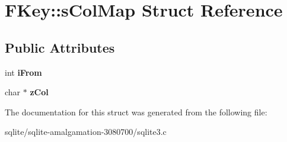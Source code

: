\hypertarget{struct_f_key_1_1s_col_map}{\section{F\+Key\+:\+:s\+Col\+Map Struct Reference}
\label{struct_f_key_1_1s_col_map}
}
\subsection*{Public Attributes}
\begin{DoxyCompactItemize}
\item 
\hypertarget{struct_f_key_1_1s_col_map_a2b0ed19d4924a93d1f3f14f891b176ed}{int {\bfseries i\+From}}\label{struct_f_key_1_1s_col_map_a2b0ed19d4924a93d1f3f14f891b176ed}

\item 
\hypertarget{struct_f_key_1_1s_col_map_a4cdef475be73cc460873051a2c2c2937}{char $\ast$ {\bfseries z\+Col}}\label{struct_f_key_1_1s_col_map_a4cdef475be73cc460873051a2c2c2937}

\end{DoxyCompactItemize}


The documentation for this struct was generated from the following file\+:\begin{DoxyCompactItemize}
\item 
sqlite/sqlite-\/amalgamation-\/3080700/sqlite3.\+c\end{DoxyCompactItemize}
